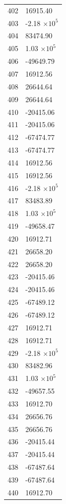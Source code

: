 \documentclass[a4paper,11pt]{article}
\begin{document}
\begin{center}
\begin{longtable}{|R{1.5cm}|R{2.6cm}|}
  402 &     16915.40 \\
  403 &        -2.18 $\times 10^{           5}$ \\
  404 &     83474.90 \\
  405 &         1.03 $\times 10^{           5}$ \\
  406 &    -49649.79 \\
  407 &     16912.56 \\
  408 &     26644.64 \\
  409 &     26644.64 \\
  410 &    -20415.06 \\
  411 &    -20415.06 \\
  412 &    -67474.77 \\
  413 &    -67474.77 \\
  414 &     16912.56 \\
  415 &     16912.56 \\
  416 &        -2.18 $\times 10^{           5}$ \\
  417 &     83483.89 \\
  418 &         1.03 $\times 10^{           5}$ \\
  419 &    -49658.47 \\
  420 &     16912.71 \\
  421 &     26658.20 \\
  422 &     26658.20 \\
  423 &    -20415.46 \\
  424 &    -20415.46 \\
  425 &    -67489.12 \\
  426 &    -67489.12 \\
  427 &     16912.71 \\
  428 &     16912.71 \\
  429 &        -2.18 $\times 10^{           5}$ \\
  430 &     83482.96 \\
  431 &         1.03 $\times 10^{           5}$ \\
  432 &    -49657.55 \\
  433 &     16912.70 \\
  434 &     26656.76 \\
  435 &     26656.76 \\
  436 &    -20415.44 \\
  437 &    -20415.44 \\
  438 &    -67487.64 \\
  439 &    -67487.64 \\
  440 &     16912.70 \\

\end{longtable}
\end{center}
\end{document}
